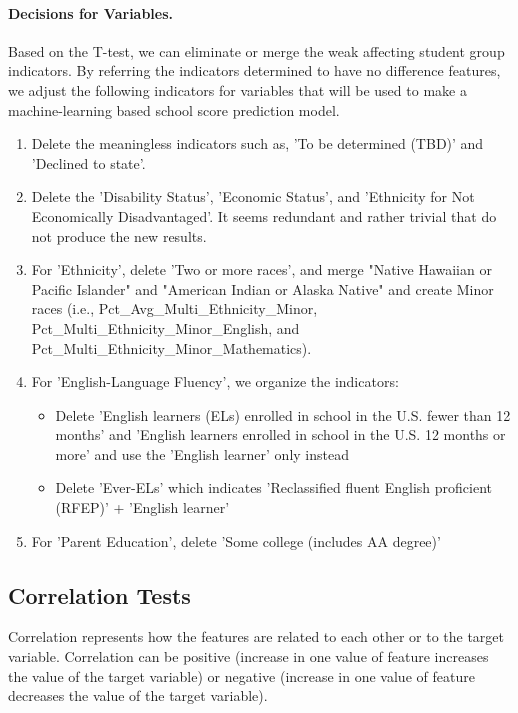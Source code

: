 \documentclass[11pt]{article}
\begin{document}
\paragraph*{Decisions for Variables.}
Based on the T-test, we can eliminate or merge the weak affecting student group indicators. 
By referring the indicators determined to have no difference features, we adjust the following indicators for variables that will be used to make a machine-learning based school score prediction model.

\begin{enumerate}
	\item Delete the meaningless indicators such as, 'To be determined (TBD)' and 'Declined to state'.
\item Delete the 'Disability Status', 'Economic Status', and 'Ethnicity for Not Economically Disadvantaged'. It seems redundant and rather trivial that do not produce the new results.
\item For 'Ethnicity', delete 'Two or more races', and merge "Native Hawaiian or Pacific Islander" and "American Indian or Alaska Native" and create Minor races (i.e., Pct\_Avg\_Multi\_Ethnicity\_Minor, Pct\_Multi\_Ethnicity\_Minor\_English, and Pct\_Multi\_Ethnicity\_Minor\_Mathematics).
\item For 'English-Language Fluency', we organize the indicators:
\begin{itemize}
	\item Delete 'English learners (ELs) enrolled in school in the U.S. fewer than 12 months' and 'English learners enrolled in school in the U.S. 12 months or more' and use the 'English learner' only instead
\item Delete 'Ever-ELs' which indicates 'Reclassified fluent English proficient (RFEP)' + 'English learner'
\end{itemize}  
\item For 'Parent Education', delete 'Some college (includes AA degree)'
\end{enumerate}

\subsection{Correlation Tests}

Correlation represents how the features are related to each other or to the target variable.
%
Correlation can be positive (increase in one value of feature increases the value of the target variable) or negative (increase in one value of feature decreases the value of the target variable).
\end{document}
